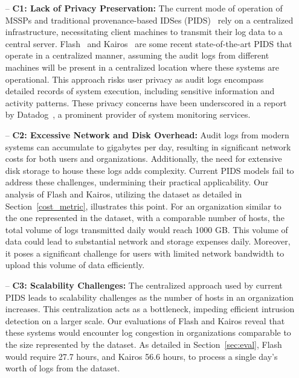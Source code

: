 \begin{itemize} [leftmargin=*]
    \item[--] \textbf{C1: Lack of Privacy Preservation:} The current mode of operation of MSSPs and traditional provenance-based IDSes (PIDS)~\cite{flash2024,cheng2023kairos,wang2022threatrace} rely on a centralized infrastructure, necessitating client machines to transmit their log data to a central server. Flash~\cite{flash2024} and Kairos~\cite{cheng2023kairos} are some recent state-of-the-art PIDS that operate in a centralized manner, assuming the audit logs from different machines will be present in a centralized location where these systems are operational. This approach risks user privacy as audit logs encompass detailed records of system execution, including sensitive information and activity patterns. These privacy concerns have been underscored in a report by Datadog~\cite{datadog}, a prominent provider of system monitoring services.
    
    \item[--] \textbf{C2: Excessive Network and Disk Overhead:} Audit logs from modern systems can accumulate to gigabytes per day, resulting in significant network costs for both users and organizations. Additionally, the need for extensive disk storage to house these logs adds complexity. Current PIDS models fail to address these challenges, undermining their practical applicability. Our analysis of Flash and Kairos, utilizing the \optc dataset as detailed in Section~\ref{cost_metric}, illustrates this point. For an organization similar to the one represented in the \optc dataset, with a comparable number of hosts, the total volume of logs transmitted daily would reach 1000 GB. This volume of data could lead to substantial network and storage expenses daily. Moreover, it poses a significant challenge for users with limited network bandwidth to upload this volume of data efficiently.
    
    \item[--] \textbf{C3: Scalability Challenges:} The centralized approach used by current PIDS leads to scalability challenges as the number of hosts in an organization increases. This centralization acts as a bottleneck, impeding efficient intrusion detection on a larger scale. Our evaluations of Flash and Kairos reveal that these systems would encounter log congestion in organizations comparable to the size represented by the \optc dataset. As detailed in Section~\ref{sec:eval}, Flash would require 27.7 hours, and Kairos 56.6 hours, to process a single day's worth of logs from the \optc dataset. %
\end{itemize}

